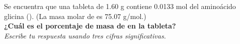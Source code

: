 Se encuentra que una tableta de 1.60 g contiene 0.0133 mol del aminoácido glicina (). (La masa molar de  es 75.07 g/mol.)\\
\textbf{¿Cuál es el porcentaje de masa de  en la tableta?}\\
\emph{Escribe tu respuesta usando tres cifras significativas.}\\